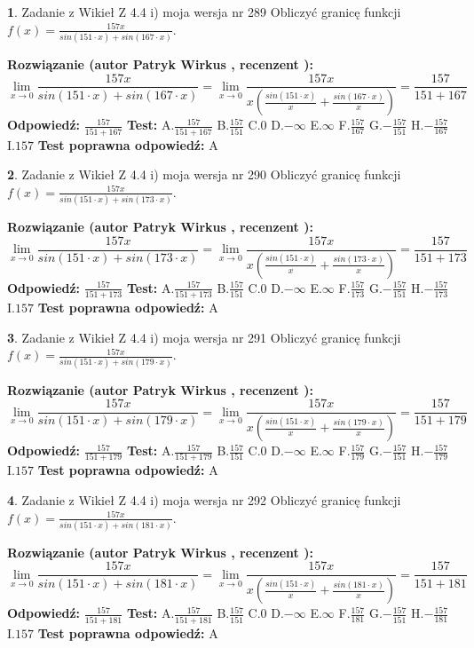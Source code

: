 \documentclass[12pt, a4paper]{article}
\theoremstyle{definition} %
\newtheorem{zad}{}
\newcommand{\zadStart}[1]{\begin{zad}#1\newline}
\newcommand{\zadStop}{\end{zad}}
\newcommand{\rozwStart}[2]{\noindent \textbf{Rozwiązanie (autor #1 , recenzent #2): }\newline}
\newcommand{\rozwStop}{\newline}
\newcommand{\odpStart}{\noindent \textbf{Odpowiedź:}\newline}
\newcommand{\odpStop}{\newline}
\newcommand{\testStart}{\noindent \textbf{Test:}\newline}
\newcommand{\testStop}{\newline}
\newcommand{\kluczStart}{\noindent \textbf{Test poprawna odpowiedź:}\newline}
\newcommand{\kluczStop}{\newline}
\begin{document}
\zadStart{Zadanie z Wikieł Z 4.4 i) moja wersja nr 289}
Obliczyć granicę funkcji $f(x)=\frac{157x}{sin(151\cdot x) +sin(167\cdot x)}$.
\zadStop
\rozwStart{Patryk Wirkus}{}
$$\lim\limits_{x\to 0}\frac{157x}{sin(151\cdot x) +sin(167\cdot x)}=\lim\limits_{x\to 0}\frac{157x}{x(\frac{sin(151\cdot x)}{x}+\frac{sin(167\cdot x)}{x})}=\frac{157}{151+167}$$
\rozwStop
\odpStart
$\frac{157}{151+167}$
\odpStop
\testStart
A.$\frac{157}{151+167}$
B.$\frac{157}{151}$
C.$0$
D.$-\infty$
E.$\infty$
F.$\frac{157}{167}$
G.$-\frac{157}{151}$
H.$-\frac{157}{167}$
I.$157$
\testStop
\kluczStart
A
\kluczStop



\zadStart{Zadanie z Wikieł Z 4.4 i) moja wersja nr 290}
Obliczyć granicę funkcji $f(x)=\frac{157x}{sin(151\cdot x) +sin(173\cdot x)}$.
\zadStop
\rozwStart{Patryk Wirkus}{}
$$\lim\limits_{x\to 0}\frac{157x}{sin(151\cdot x) +sin(173\cdot x)}=\lim\limits_{x\to 0}\frac{157x}{x(\frac{sin(151\cdot x)}{x}+\frac{sin(173\cdot x)}{x})}=\frac{157}{151+173}$$
\rozwStop
\odpStart
$\frac{157}{151+173}$
\odpStop
\testStart
A.$\frac{157}{151+173}$
B.$\frac{157}{151}$
C.$0$
D.$-\infty$
E.$\infty$
F.$\frac{157}{173}$
G.$-\frac{157}{151}$
H.$-\frac{157}{173}$
I.$157$
\testStop
\kluczStart
A
\kluczStop



\zadStart{Zadanie z Wikieł Z 4.4 i) moja wersja nr 291}
Obliczyć granicę funkcji $f(x)=\frac{157x}{sin(151\cdot x) +sin(179\cdot x)}$.
\zadStop
\rozwStart{Patryk Wirkus}{}
$$\lim\limits_{x\to 0}\frac{157x}{sin(151\cdot x) +sin(179\cdot x)}=\lim\limits_{x\to 0}\frac{157x}{x(\frac{sin(151\cdot x)}{x}+\frac{sin(179\cdot x)}{x})}=\frac{157}{151+179}$$
\rozwStop
\odpStart
$\frac{157}{151+179}$
\odpStop
\testStart
A.$\frac{157}{151+179}$
B.$\frac{157}{151}$
C.$0$
D.$-\infty$
E.$\infty$
F.$\frac{157}{179}$
G.$-\frac{157}{151}$
H.$-\frac{157}{179}$
I.$157$
\testStop
\kluczStart
A
\kluczStop



\zadStart{Zadanie z Wikieł Z 4.4 i) moja wersja nr 292}
Obliczyć granicę funkcji $f(x)=\frac{157x}{sin(151\cdot x) +sin(181\cdot x)}$.
\zadStop
\rozwStart{Patryk Wirkus}{}
$$\lim\limits_{x\to 0}\frac{157x}{sin(151\cdot x) +sin(181\cdot x)}=\lim\limits_{x\to 0}\frac{157x}{x(\frac{sin(151\cdot x)}{x}+\frac{sin(181\cdot x)}{x})}=\frac{157}{151+181}$$
\rozwStop
\odpStart
$\frac{157}{151+181}$
\odpStop
\testStart
A.$\frac{157}{151+181}$
B.$\frac{157}{151}$
C.$0$
D.$-\infty$
E.$\infty$
F.$\frac{157}{181}$
G.$-\frac{157}{151}$
H.$-\frac{157}{181}$
I.$157$
\testStop
\kluczStart
A
\kluczStop
\end{document}
